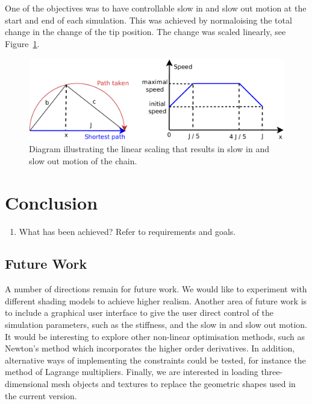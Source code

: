 \documentclass[paper=a4, fontsize=11pt]{scrartcl} %
\numberwithin{equation}{section} %
\numberwithin{figure}{section} %
\numberwithin{table}{section} %
\begin{document}
One of the objectives was to have controllable slow in and slow out motion at the start and end of each simulation. This was achieved by normaloising the total change in the change of the tip position. The change was scaled linearly, see Figure~\ref{fig:scaling}. \\
\begin{figure}[h]
\centering
\includegraphics[scale=0.5]{SpeedDiagram}
\caption{Diagram illustrating the linear scaling that results in slow in and slow out motion of the chain.}
\label{fig:scaling}
\end{figure}

  
\section{Conclusion}

\begin{enumerate}
\item What has been achieved? Refer to requirements and goals.
\end{enumerate}

\subsection{Future Work}

A number of directions remain for future work. We would like to experiment with different shading models to achieve higher realism. Another area of future work is to include a graphical user interface to give the user direct control of the simulation  parameters, such as the stiffness, and the slow in and slow out motion. It would be interesting to explore other non-linear optimisation methods, such as Newton's method which incorporates the higher order derivatives. In addition,  alternative ways of implementing the constraints could be tested, for instance the method of Lagrange multipliers. Finally, we are interested in loading three-dimensional mesh objects and textures to replace the geometric shapes used in the current version. 

\nocite{Fedor2003}
\nocite{Welman1993}
\nocite{Crai55}
{}

\end{document}
